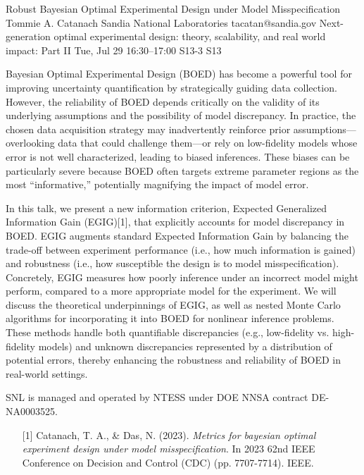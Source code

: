 \begin{talk}
  {Robust Bayesian Optimal Experimental Design under Model Misspecification}%
  {Tommie A. Catanach}%
  {Sandia National Laboratories}%
  {tacatan@sandia.gov}%
  {Next-generation optimal experimental design: theory, scalability, and real world impact: Part II}%
  {}%
  {Tue, Jul 29 16:30–17:00}%
  {S13-3}%
  {S13}%
				
			
Bayesian Optimal Experimental Design (BOED) has become a powerful tool for improving uncertainty quantification by strategically guiding data collection. However, the reliability of BOED depends critically on the validity of its underlying assumptions and the possibility of model discrepancy. In practice, the chosen data acquisition strategy may inadvertently reinforce prior assumptions—overlooking data that could challenge them—or rely on low-fidelity models whose error is not well characterized, leading to biased inferences. These biases can be particularly severe because BOED often targets extreme parameter regions as the most “informative,” potentially magnifying the impact of model error.

In this talk, we present a new information criterion, Expected Generalized Information Gain (EGIG)[1], that explicitly accounts for model discrepancy in BOED. EGIG augments standard Expected Information Gain by balancing the trade-off between experiment performance (i.e., how much information is gained) and robustness (i.e., how susceptible the design is to model misspecification). Concretely, EGIG measures how poorly inference under an incorrect model might perform, compared to a more appropriate model for the experiment. We will discuss the theoretical underpinnings of EGIG, as well as nested Monte Carlo algorithms for incorporating it into BOED for nonlinear inference problems. These methods handle both quantifiable discrepancies (e.g., low-fidelity vs. high-fidelity models) and unknown discrepancies represented by a distribution of potential errors, thereby enhancing the robustness and reliability of BOED in real-world settings.

SNL is managed and operated by NTESS under DOE NNSA contract DE-NA0003525. 
\medskip

\begin{enumerate}
	\item[{[1]}] Catanach, T. A., \& Das, N. (2023). {\it Metrics for bayesian optimal experiment design under model misspecification}. In 2023 62nd IEEE Conference on Decision and Control (CDC) (pp. 7707-7714). IEEE.
\end{enumerate}
\end{talk}

